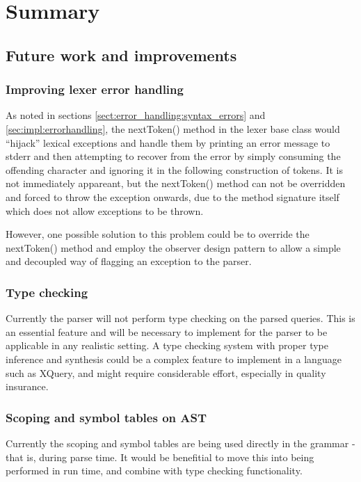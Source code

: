 \chapter{Summary}

\section{Future work and improvements}
\subsection{Improving lexer error handling}
As noted in sections \ref{sect:error_handling:syntax_errors} and
\ref{sec:impl:errorhandling}, the nextToken() method in the lexer base class
would ``hijack'' lexical exceptions and handle them by printing an error message
to stderr and then attempting to recover from the error by simply consuming the
offending character and ignoring it in the following construction of tokens. It is 
not immediately appareant, but the nextToken() method can not be overridden and
forced to throw the exception onwards, due to the method signature itself which
does not allow exceptions to be thrown. 

However, one possible solution to this problem could be to override the
nextToken() method and employ the observer design
pattern to allow a
simple and decoupled way of flagging an exception to the parser.

\subsection{Type checking}
Currently the parser will not perform type checking on the parsed queries. This
is an essential feature and will be necessary to implement for the parser to be
applicable in any realistic setting. A type checking system with proper type
inference and synthesis could be a complex feature to implement in a language
such as XQuery, and might require considerable effort, especially in quality
insurance. 

\subsection{Scoping and symbol tables on AST}
Currently the scoping and symbol tables are being used directly in the grammar -
that is, during parse time. It would be benefitial to move this into being
performed in run time, and combine with type checking functionality.

